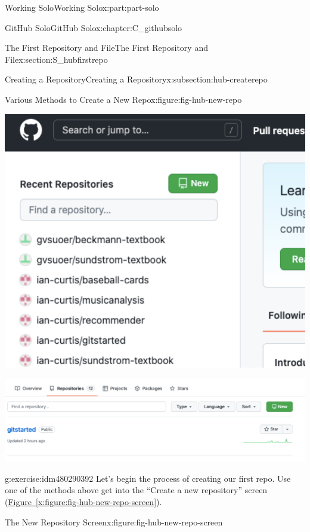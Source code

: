 \documentclass[oneside,10pt,]{book}
\newcommand{\xreffont}{\relax}
\begin{document}
\begin{partptx}{Working Solo}{}{Working Solo}{}{}{x:part:part-solo}
\begin{chapterptx}{GitHub Solo}{}{GitHub Solo}{}{}{x:chapter:C_githubsolo}
\begin{sectionptx}{The First Repository and File}{}{The First Repository and File}{}{}{x:section:S_hubfirstrepo}
\begin{subsectionptx}{Creating a Repository}{}{Creating a Repository}{}{}{x:subsection:hub-createrepo}
\begin{figureptx}{Various Methods to Create a New Repo}{x:figure:fig-hub-new-repo}{}
\begin{sidebyside}{2}{0.025}{0.025}{0.05}
\begin{sbspanel}{0.45}
\includegraphics[width=\linewidth]{external/hub_new_repo_home.pdf}
\end{sbspanel}%
\end{sidebyside}%
\begin{image}{0.05}{0.9}{0.05}%
\includegraphics[width=\linewidth]{external/hub_new_repo_yourrepos.pdf}
\end{image}%
\tcblower
\end{figureptx}%
\begin{inlineexercise}{}{g:exercise:idm480290392}%
Let's begin the process of creating our first repo. Use one of the methods above get into the ``Create a new repository'' screen (\hyperref[x:figure:fig-hub-new-repo-screen]{Figure~{\xreffont\ref{x:figure:fig-hub-new-repo-screen}}}).%
\end{inlineexercise}%
\begin{figureptx}{The New Repository Screen}{x:figure:fig-hub-new-repo-screen}{}%
\begin{image}{0.05}{0.9}{0.05}%

\end{image}
\end{figureptx}
\end{subsectionptx}
\end{sectionptx}
\end{chapterptx}
\end{partptx}
\end{document}
